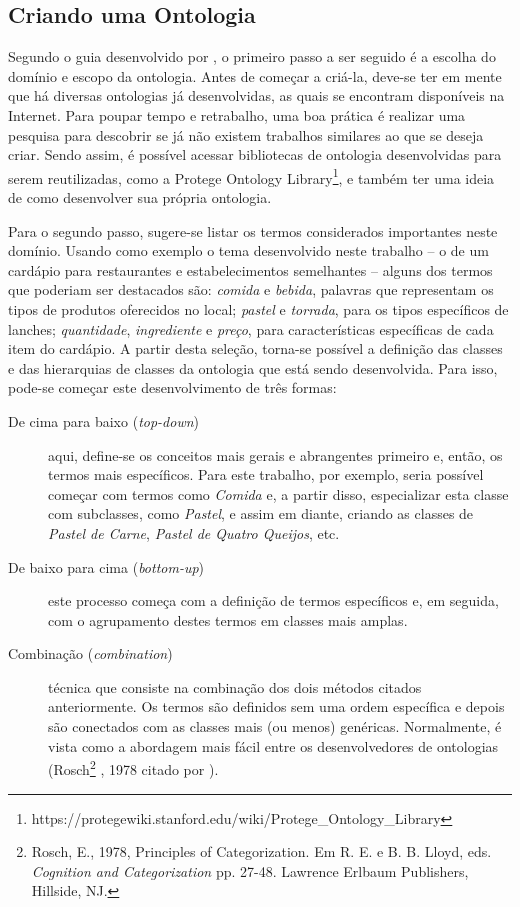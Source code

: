 \subsection{Criando uma Ontologia}
Segundo o guia desenvolvido por \cite{NOY2001}, o primeiro passo a ser seguido é a escolha do domínio e escopo da ontologia. Antes de começar a criá-la, deve-se ter em mente que há diversas ontologias já desenvolvidas, as quais se encontram disponíveis na Internet. Para poupar tempo e retrabalho, uma boa prática é realizar uma pesquisa para descobrir se já não existem trabalhos similares ao que se deseja criar. Sendo assim, é possível acessar bibliotecas de ontologia desenvolvidas para serem reutilizadas, como a Protege Ontology Library\footnote{https://protegewiki.stanford.edu/wiki/Protege\_Ontology\_Library}, e também ter uma ideia de como desenvolver sua própria ontologia.

Para o segundo passo, sugere-se listar os termos considerados importantes neste domínio. Usando como exemplo o tema desenvolvido neste trabalho -- o de um cardápio para restaurantes e estabelecimentos semelhantes -- alguns dos termos que poderiam ser destacados são: \emph{comida} e \emph{bebida}, palavras que representam os tipos de produtos oferecidos no local; \emph{pastel} e \emph{torrada}, para os tipos específicos de lanches; \emph{quantidade}, \emph{ingrediente} e \emph{preço}, para características específicas de cada item do cardápio. A partir desta seleção, torna-se possível a definição das classes e das hierarquias de classes da ontologia que está sendo desenvolvida. Para isso, pode-se começar este desenvolvimento de três formas:
\begin{description}
    \item [De cima para baixo (\emph{top-down})] aqui, define-se os conceitos mais gerais e abrangentes primeiro e, então, os termos mais específicos. Para este trabalho, por exemplo, seria possível começar com termos como \emph{Comida} e, a partir disso, especializar esta classe com subclasses, como \emph{Pastel}, e assim em diante, criando as classes de \emph{Pastel de Carne}, \emph{Pastel de Quatro Queijos}, etc.
    \item [De baixo para cima (\emph{bottom-up})] este processo começa com a definição de termos específicos e, em seguida, com o agrupamento destes termos em classes mais amplas.
    \item [Combinação (\emph{combination})] técnica que consiste na combinação dos dois métodos citados anteriormente. Os termos são definidos sem uma ordem específica e depois são conectados com as classes mais (ou menos) genéricas. Normalmente, é vista como a abordagem mais fácil entre os desenvolvedores de ontologias (Rosch\footnote{Rosch, E., 1978, Principles of Categorization. Em R. E. e B. B. Lloyd, eds. \emph{Cognition and Categorization} pp. 27-48. Lawrence Erlbaum Publishers, Hillside, NJ.} , 1978 citado por \cite{NOY2001}).
\end{description}

